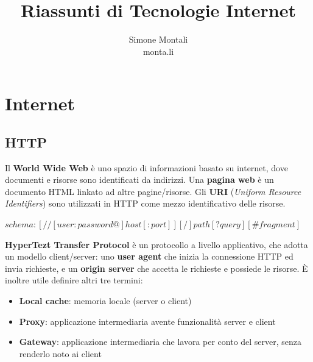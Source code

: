 \documentclass[11pt]{article}
\newcommand{\code}[1]{\texttt{#1}}
\begin{document}
\author{Simone Montali\\monta.li}
\title{Riassunti di Tecnologie Internet}

\maketitle

\medskip
\section{Internet}
\subsection{HTTP}
Il \textbf{World Wide Web} è uno spazio di informazioni basato su internet, dove documenti e risorse sono identificati da indirizzi. Una \textbf{pagina web} è un documento HTML linkato ad altre pagine/risorse.
Gli \textbf{URI} (\textit{Uniform Resource Identifiers}) sono utilizzati in HTTP come mezzo identificativo delle risorse. 
\begin{center}
    \code{$schema:[//[user:password@]host[:port]][/]path[?query][\#fragment]$}
\end{center}
\textbf{HyperTezt Transfer Protocol} è un protocollo a livello applicativo, che adotta un modello client/server: uno \textbf{user agent} che inizia la connessione HTTP ed invia richieste, e un \textbf{origin server} che accetta le richieste e possiede le risorse. È inoltre utile definire altri tre termini:
\begin{itemize}
    \item \textbf{Local cache}: memoria locale (server o client)
    \item \textbf{Proxy}: applicazione intermediaria avente funzionalità server e client 
    \item \textbf{Gateway}: applicazione intermediaria che lavora per conto del server, senza renderlo noto ai client 
\end{itemize}
\end{document}
